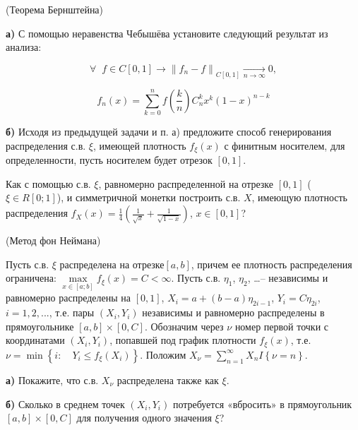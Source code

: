 \begin{problem}
(Теорема Бернштейна) 

\textbf{а)} С помощью неравенства Чебышёва установите следующий результат из анализа: 

\[
\forall \; \; f\in C\left[0,1\right]\to \left\| f_{n} -f\right\| _{C\left[0,1\right]} \xrightarrow[{n\to \infty }]{} 0,
\] 

\[
f_{n} \left(x\right)=\sum_{k=0}^{n}f\left(\frac{k}{n} \right) C_{n}^{k} x^{k} \left(1-x\right)^{n-k} 
\]

\textbf{б)} Исходя из предыдущей задачи и п. а) предложите способ генерирования распределения с.в. $\xi $, имеющей плотность $f_{\xi } \left(x\right)$ с финитным носителем, для определенности, пусть носителем будет отрезок $\left[0,1\right]$.
\end{problem}

\begin{problem}
Как с помощью с.в. $\xi $, равномерно распределенной на отрезке $\left[0,1\right]$ ($\xi \in R\left[0;1\right]$), и симметричной монетки построить с.в. $X$, имеющую плотность распределения $f_{X} (x)=\frac{1}{4} \left(\frac{1}{\sqrt{x} } +\frac{1}{\sqrt{1-x} } \right)$, $x\in \left[0,1\right]$?
\end{problem}

\begin{problem}
(Метод фон Неймана) 

Пусть с.в. $\xi $ распределена на отрезке$\left[a,b\right]$, причем ее плотность распределения ограничена: $\mathop{\max }\limits_{x\in \left[a;b\right]} f_{\xi } (x)=C<\infty $. Пусть с.в. $\eta _{1} $, $\eta _{2} $, \dots  -- независимы и равномерно распределены на $\left[0,1\right]$, $X_{i} =a+\left(b-a\right)\eta _{2i-1} $, $Y_{i} =C\eta _{2i} $, $i=1,2,...$, т.е. пары $\left(X_{i} ,Y_{i} \right)$ независимы и равномерно распределены в прямоугольнике $\left[a,b\right]\times \left[0,C\right]$. Обозначим через $\nu $ номер первой точки с координатами $\left(X_{i} ,Y_{i} \right)$, попавшей под график плотности $f_{\xi } (x)$, т.е. $\nu =\min \left\{i:\quad Y_{i} \le f_{\xi } (X_{i} )\right\}$. Положим $X_{\nu } =\sum _{n=1}^{\infty }X_{n} I\left\{\nu =n\right\} $.

\textbf{а)} Покажите, что с.в. $X_{\nu } $ распределена также как $\xi $.

\textbf{б)} Сколько в среднем точек $\left(X_{i} ,Y_{i} \right)$ потребуется «вбросить» в прямоугольник $\left[a,b\right]\times \left[0,C\right]$ для получения одного значения $\xi $?
\end{problem}